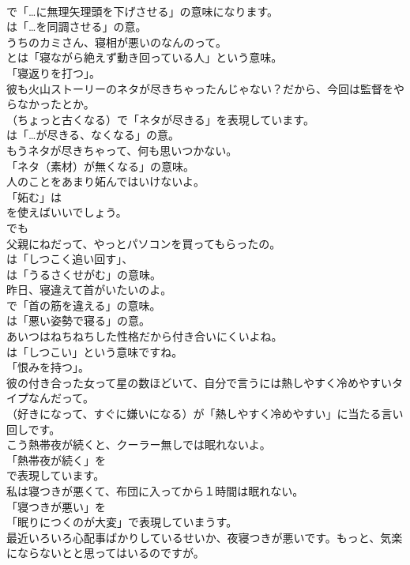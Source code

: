 \documentclass[8pt]{extreport}
\begin{document}
\begin{CJK}{UTF8}{min}
\\	で「…に無理矢理頭を下げさせる」の意味になります。
\\	は「…を同調させる」の意。	
\\	うちのカミさん、寝相が悪いのなんのって。 
\\	とは「寝ながら絶えず動き回っている人」という意味。
\\	「寝返りを打つ」。	
\\	彼も火山ストーリーのネタが尽きちゃったんじゃない？だから、今回は監督をやらなかったとか。 
\\	（ちょっと古くなる）で「ネタが尽きる」を表現しています。
\\	は「…が尽きる、なくなる」の意。	
\\	もうネタが尽きちゃって、何も思いつかない。 
\\	「ネタ（素材）が無くなる」の意味。	
\\	人のことをあまり妬んではいけないよ。 
\\	「妬む」は
\\	を使えばいいでしょう。
\\	でも
\\	父親にねだって、やっとパソコンを買ってもらったの。 
\\	は「しつこく追い回す」、
\\	は「うるさくせがむ」の意味。	
\\	昨日、寝違えて首がいたいのよ。 
\\	で「首の筋を違える」の意味。
\\	は「悪い姿勢で寝る」の意。	
\\	あいつはねちねちした性格だから付き合いにくいよね。 
\\	は「しつこい」という意味ですね。
\\	「恨みを持つ」。	
\\	彼の付き合った女って星の数ほどいて、自分で言うには熱しやすく冷めやすいタイプなんだって。 
\\	（好きになって、すぐに嫌いになる）が「熱しやすく冷めやすい」に当たる言い回しです。	
\\	こう熱帯夜が続くと、クーラー無しでは眠れないよ。 
\\	「熱帯夜が続く」を
\\	で表現しています。	
\\	私は寝つきが悪くて、布団に入ってから１時間は眠れない。 
\\	「寝つきが悪い」を
\\	「眠りにつくのが大変」で表現していまうす。	
\\	最近いろいろ心配事ばかりしているせいか、夜寝つきが悪いです。もっと、気楽にならないとと思ってはいるのですが。 

\end{CJK}
\end{document}
